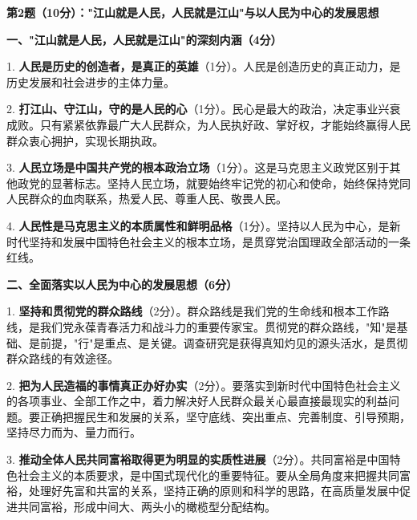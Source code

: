 \documentclass[12pt, a4paper]{article}
\begin{document}
\begin{answerbox}

\textbf{第2题（10分）："江山就是人民，人民就是江山"与以人民为中心的发展思想}

\textbf{一、"江山就是人民，人民就是江山"的深刻内涵（4分）}

1. \textbf{人民是历史的创造者，是真正的英雄}（1分）。人民是创造历史的真正动力，是历史发展和社会进步的主体力量。

2. \textbf{打江山、守江山，守的是人民的心}（1分）。民心是最大的政治，决定事业兴衰成败。只有紧紧依靠最广大人民群众，为人民执好政、掌好权，才能始终赢得人民群众衷心拥护，实现长期执政。

3. \textbf{人民立场是中国共产党的根本政治立场}（1分）。这是马克思主义政党区别于其他政党的显著标志。坚持人民立场，就要始终牢记党的初心和使命，始终保持党同人民群众的血肉联系，热爱人民、尊重人民、敬畏人民。

4. \textbf{人民性是马克思主义的本质属性和鲜明品格}（1分）。坚持以人民为中心，是新时代坚持和发展中国特色社会主义的根本立场，是贯穿党治国理政全部活动的一条红线。

\textbf{二、全面落实以人民为中心的发展思想（6分）}

1. \textbf{坚持和贯彻党的群众路线}（2分）。群众路线是我们党的生命线和根本工作路线，是我们党永葆青春活力和战斗力的重要传家宝。贯彻党的群众路线，"知"是基础、是前提，"行"是重点、是关键。调查研究是获得真知灼见的源头活水，是贯彻群众路线的有效途径。

2. \textbf{把为人民造福的事情真正办好办实}（2分）。要落实到新时代中国特色社会主义的各项事业、全部工作之中，着力解决好人民群众最关心最直接最现实的利益问题。要正确把握民生和发展的关系，坚守底线、突出重点、完善制度、引导预期，坚持尽力而为、量力而行。

3. \textbf{推动全体人民共同富裕取得更为明显的实质性进展}（2分）。共同富裕是中国特色社会主义的本质要求，是中国式现代化的重要特征。要从全局角度来把握共同富裕，处理好先富和共富的关系，坚持正确的原则和科学的思路，在高质量发展中促进共同富裕，形成中间大、两头小的橄榄型分配结构。

\end{answerbox}

\vspace{6pt}
\end{document}

